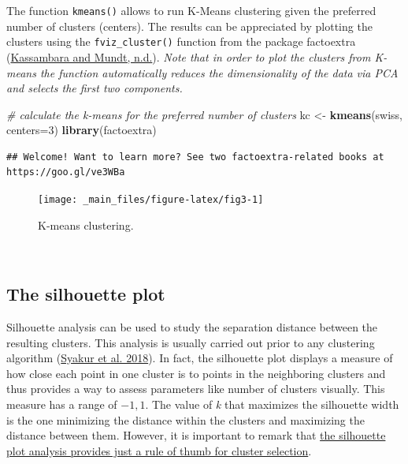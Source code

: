 \documentclass[
]{svmono}
\newenvironment{Shaded}{\begin{snugshade}}{\end{snugshade}}
\newcommand{\AttributeTok}[1]{\textcolor[rgb]{0.13,0.29,0.53}{#1}}
\newcommand{\CommentTok}[1]{\textcolor[rgb]{0.56,0.35,0.01}{\textit{#1}}}
\newcommand{\DecValTok}[1]{\textcolor[rgb]{0.00,0.00,0.81}{#1}}
\newcommand{\FunctionTok}[1]{\textcolor[rgb]{0.13,0.29,0.53}{\textbf{#1}}}
\newcommand{\NormalTok}[1]{#1}
\newcommand{\OtherTok}[1]{\textcolor[rgb]{0.56,0.35,0.01}{#1}}
\newcommand{\SpecialCharTok}[1]{\textcolor[rgb]{0.81,0.36,0.00}{\textbf{#1}}}
\begin{document}
The function \texttt{kmeans()} allows to run K-Means clustering given the
preferred number of clusters (centers). The results can be appreciated
by plotting the clusters using the \texttt{fviz\_cluster()} function from the
package factoextra (\protect\hyperlink{ref-kassambara}{Kassambara and Mundt, n.d.}). \emph{Note that in order to plot the
clusters from K-means the function automatically reduces the
dimensionality of the data via PCA and selects the first two
components.}

\begin{Shaded}
\begin{Highlighting}[]
\CommentTok{\# calculate the k{-}means for the preferred number of clusters}
\NormalTok{kc }\OtherTok{\textless{}{-}} \FunctionTok{kmeans}\NormalTok{(swiss, }\AttributeTok{centers=}\DecValTok{3}\NormalTok{)}
\FunctionTok{library}\NormalTok{(factoextra) }
\end{Highlighting}
\end{Shaded}

\begin{verbatim}
## Welcome! Want to learn more? See two factoextra-related books at https://goo.gl/ve3WBa
\end{verbatim}

\begin{Shaded}
\end{Shaded}

\begin{figure}[H]

{\centering \texttt{[image: \_main\_files/figure-latex/fig3-1]} 

}

\caption{K-means clustering.}\label{fig:fig3}
\end{figure}

~

\hypertarget{the-silhouette-plot}{%
\subsection{The silhouette plot}\label{the-silhouette-plot}}

Silhouette analysis can be used to study the separation distance between
the resulting clusters. This analysis is usually carried out prior to
any clustering algorithm (\protect\hyperlink{ref-syakur2018}{Syakur et al. 2018}). In fact, the silhouette plot
displays a measure of how close each point in one cluster is to points
in the neighboring clusters and thus provides a way to assess parameters
like number of clusters visually. This measure has a range of \(-1, 1\).
The value of \emph{k} that maximizes the silhouette width is the one
minimizing the distance within the clusters and maximizing the distance
between them. However, it is important to remark that \ul{the silhouette
plot analysis provides just a rule of thumb for cluster
selection}.
\end{document}
